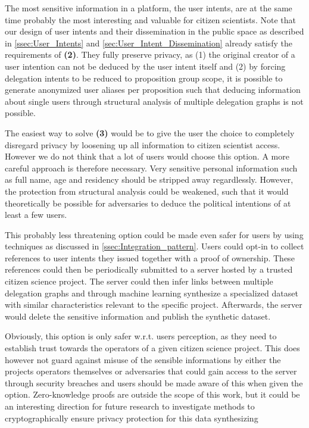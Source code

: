 The most sensitive information in a  platform, the user intents, are at the same time probably the most interesting and valuable for citizen scientists.
Note that our design of user intents and their dissemination in the public space as described in \autoref{ssec:User_Intents} and \autoref{sec:User_Intent_Dissemination} already satisfy the requirements of \textbf{(2)}.
They fully preserve privacy, as (1) the original creator of a user intention can not be deduced by the user intent itself and (2) by forcing delegation intents to be reduced to proposition group scope, it is possible to generate anonymized user aliases per proposition such that deducing information about single users through structural analysis of multiple delegation graphs is not possible.

The easiest way to solve \textbf{(3)} would be to give the user the choice to completely disregard privacy by loosening up all information to citizen scientist access.
However we do not think that a lot of users would choose this option.
A more careful approach is therefore necessary.
Very sensitive personal information such as full name, age and residency should be stripped away regardlessly.
However, the protection from structural analysis could be weakened, such that it would theoretically be possible for adversaries to deduce the political intentions of at least a few users.

This probably less threatening option could be made even safer for users by using techniques as discussed in \autoref{ssec:Integration_pattern}.
Users could opt-in to collect references to user intents they issued together with a proof of ownership.
These references could then be periodically submitted to a server hosted by a trusted citizen science project.
The server could then infer links between multiple delegation graphs and through machine learning synthesize a specialized dataset with similar characteristics relevant to the specific project.
Afterwards, the server would delete the sensitive information and publish the synthetic dataset.

Obviously, this option is only safer w.r.t. users perception, as they need to establish trust towards the operators of a given citizen science project.
This does however not guard against misuse of the sensible informations by either the projects operators themselves or adversaries that could gain access to the server through security breaches and users should be made aware of this when given the option.
Zero-knowledge proofs are outside the scope of this work, but it could be an interesting direction for future research to investigate methods to  cryptographically ensure privacy protection for this data synthesizing 


